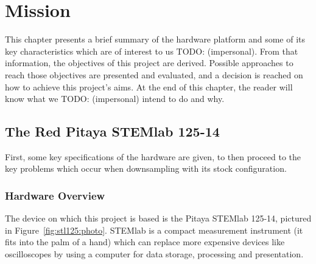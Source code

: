\chapter{Mission} %
\label{ch:mission}

This chapter presents a brief summary of the hardware platform and some of its
key characteristics  which are of  interest to us TODO: (impersonal). From that  information, the
objectives of  this project  are derived. Possible  approaches to  reach those
objectives are  presented and evaluated, and  a decision is reached  on how to
achieve this project's aims. At the end  of this chapter, the reader will know
what we TODO: (impersonal) intend to do and why.


\section{The Red Pitaya STEMlab 125-14} %
\label{sec:stl125}

First, some key  specifications of the hardware are given,  to then proceed to
the key problems which occur when downsampling with its stock configuration.


\subsection{Hardware Overview} %
\label{subsec:stl125:hardware_overview}

The  device on  which this  project  is based  is the  Pitaya STEMlab  125-14,
pictured  in Figure~\ref{fig:stl125:photo}. STEMlab  is a  compact measurement
instrument (it fits into the palm of  a hand) which can replace more expensive
devices like  oscilloscopes by using  a computer for data  storage, processing
and presentation.

